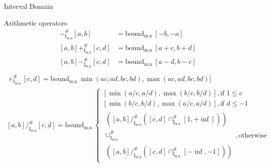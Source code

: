 \documentclass{beamer}
\newcommand{\Intmn}{\textrm{I}_{\textrm{m,n}}}
\newcommand{\bound}{\textrm{bound}_{\textrm{m,n}}}
\begin{document}
\begin{frame}{Interval Domain}
\begin{overprint}
        \begin{block}{Arithmetic operators}
            \begin{align*}
                -^\#_{\Intmn}[a,b]        & = \bound\ [-b, -a]   \\
                [a,b] +^\#_{\Intmn} [c,d] & = \bound\ [a+c,b+d]  \\
                [a,b] -^\#_{\Intmn} [c,d] & = \bound\ [a-d, b-c] \\
            \end{align*}
            \vspace{-3em}
            \begin{gather*}
                [a,b] \times^\#_{\Intmn} [c,d] = \bound\ \min(ac, ad, bc, bd), \max(ac, ad, bc, bd)] \\
                [a,b] /^\#_{\Intmn} [c,d] = \bound\
                \begin{cases}
                    [\min(a/c, a/d), \max(b/c, b/d)], \mbox{if } 1 \leq c  \\
                    [\min(b/c, b/d), \max(a/c, a/d)], \mbox{if } d \leq -1 \\
                    \begin{gathered}
                        ([a,b] /^\#_{\Intmn} ([c,d] \cap^\#_{\Intmn} [1,+\inf])) \\
                        \cup^\#_{\Intmn} \\
                        ([a,b] /^\#_{\Intmn} ([c,d] \cap^\#_{\Intmn} [-\inf,-1]))
                    \end{gathered}, \mbox{otherwise}
                \end{cases}
            \end{gather*}
        \end{block}


\end{overprint}
\end{frame}
\end{document}
